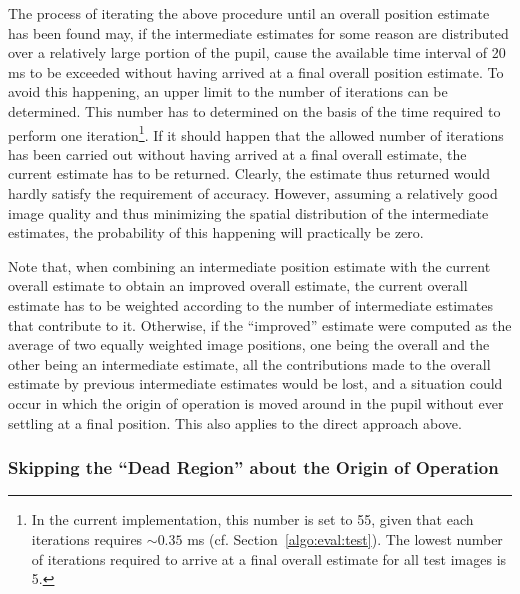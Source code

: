 The process of iterating the above procedure until an overall position
estimate has been found may, if the intermediate estimates for some
reason are distributed over a relatively large portion of the pupil,
cause the available time interval of 20 ms to be exceeded without
having arrived at a final overall position estimate.  To avoid this
happening, an upper limit to the number of iterations can be
determined.  This number has to determined on the basis of the time
required to perform one iteration\footnote{\label{pg:iterationtime}In
  the current implementation, this number is set to 55, given that
  each iterations requires $\sim 0.35$ ms (cf.
  Section~\ref{algo:eval:test}).  The lowest number of iterations
  required to arrive at a final overall estimate for all test images
  is 5.}.  If it should happen that the allowed number of iterations
has been carried out without having arrived at a final overall
estimate, the current estimate has to be returned.  Clearly, the
estimate thus returned would hardly satisfy the requirement of
accuracy.  However, assuming a relatively good image quality and thus
minimizing the spatial distribution of the intermediate estimates, the
probability of this happening will practically be zero.

Note that, when combining an intermediate position estimate with the
current overall estimate to obtain an improved overall estimate, the
current overall estimate has to be weighted according to the number of
intermediate estimates that contribute to it.  Otherwise, if the
``improved'' estimate were computed as the average of two equally
weighted image positions, one being the overall and the other being an
intermediate estimate, all the contributions made to the overall
estimate by previous intermediate estimates would be lost, and a
situation could occur in which the origin of operation is moved around
in the pupil without ever settling at a final position.  This also
applies to the direct approach above.

\subsubsection{Skipping the ``Dead Region'' about the Origin of
  Operation}
\label{pg:dead}


